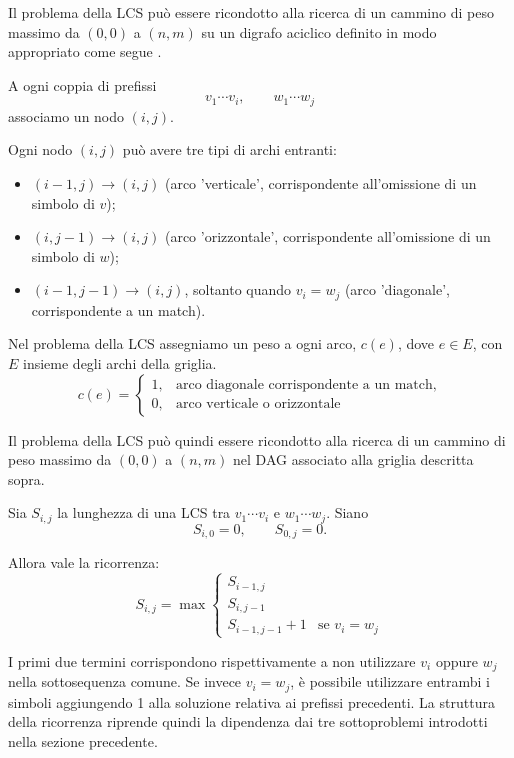 Il problema della LCS può essere ricondotto alla ricerca di un cammino di peso massimo
da $(0,0)$ a $(n,m)$ su un digrafo aciclico definito in modo appropriato come segue
\cite[pp.~172--177]{jones--pevzner}.

A ogni coppia di prefissi
\[
    v_1\cdots v_i,\qquad w_1\cdots w_j
\]
associamo un nodo $(i,j)$.

Ogni nodo $(i,j)$ può avere tre tipi di archi entranti:
\begin{itemize}
    \item $(i-1,j)\rightarrow(i,j)$ (arco 'verticale', corrispondente all'omissione di un simbolo di $v$);
    \item $(i,j-1)\rightarrow(i,j)$ (arco 'orizzontale', corrispondente all'omissione di un simbolo di $w$);
    \item $(i-1,j-1)\rightarrow(i,j)$, soltanto quando $v_i=w_j$ (arco 'diagonale', corrispondente a un match).
\end{itemize}

Nel problema della LCS assegniamo un peso a ogni arco, $c(e)$, dove $e \in E$, con $E$ insieme degli archi della griglia.
\[
    c(e) = \begin{cases}
        1, & \text{arco diagonale corrispondente a un match},\\
        0, & \text{arco verticale o orizzontale}
    \end{cases}
\]

Il problema della LCS può quindi essere ricondotto alla ricerca di un cammino di peso massimo da $(0,0)$ a $(n,m)$ nel DAG associato alla griglia descritta sopra.

Sia $S_{i,j}$ la lunghezza di una LCS tra $v_{1}\cdots v_{i}$ e $w_{1} \cdots w_{j}$.
Siano 
\[
    S_{i,0} = 0, \qquad S_{0,j} = 0.
\]

Allora vale la ricorrenza:
\[
    S_{i,j} = \max \begin{cases}
        S_{i-1,j}\\
        S_{i,j-1}\\
        S_{i-1,j-1} + 1 &\text{se }v_i = w_j
    \end{cases}
\]

I primi due termini corrispondono rispettivamente a non utilizzare $v_{i}$ oppure $w_{j}$ nella sottosequenza comune.
Se invece $v_{i} = w_{j}$, è possibile utilizzare entrambi i simboli aggiungendo 1 alla soluzione relativa ai prefissi
precedenti. La struttura della ricorrenza riprende quindi la dipendenza dai tre sottoproblemi introdotti nella sezione precedente.

